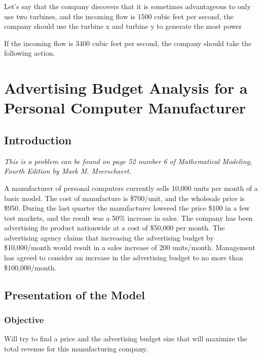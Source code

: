 \documentclass{report}
\begin{document}
\hspace{5mm} Let's say that the company discovers that it is sometimes advantageous to only use two turbines, and the incoming flow is 1500 cubic feet per second, the company should use the turbine x and turbine y to generate the most power
\vspace{5mm}

\hspace{5mm} If the incoming flow is 3400 cubic feet per second, the company should take the following action.


\chapter{Advertising Budget Analysis for a Personal Computer Manufacturer}
\section{Introduction}
\emph{This is a problem can be found on page 52 number 6 of \textit{Mathematical Modeling, Fourth Edition} by Mark M. Meerschaert.}

\vspace{5mm}
A manufacturer of personal computers currently sells 10,000 units per month of a basic model. The cost of manufacture is \$700/unit, and the wholesale price is \$950. During the last quarter the manufacturer lowered the price \$100 in a few test markets, and the result was a 50\% increase in sales. The company has been advertising its product nationwide at a cost of \$50,000 per month. The advertising agency claims that increasing the advertising budget by \$10,000/month would result in a sales increase of 200 units/month. Management has agreed to consider an increase in the advertising budget to no more than \$100,000/month.

\section{Presentation of the Model}
\subsection{Objective}
Will try to find a price and the advertising budget size that will maximize the total revenue for this manufacturing company.
\end{document}
